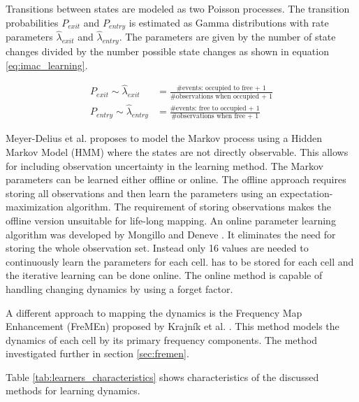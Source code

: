 
Transitions between states are modeled as two Poisson processes. The transition probabilities $P_{exit}$ and $P_{entry}$ is estimated as Gamma distributions with rate parameters $\hat{\lambda}_{exit}$ and $\hat{\lambda}_{entry}$.
The parameters are given by the number of state changes divided by the number possible state changes as shown in equation \ref{eq:imac_learning}.

\begin{align}
	P_{exit} \sim \hat{\lambda}_{exit} &= \frac{\text{\#events: occupied to free + 1}}{\text{\#observations when occupied + 1}} \label{eq:imac_learning}\\
	P_{entry} \sim\hat{\lambda}_{entry} &= \frac{\text{\#events: free to occupied + 1}}{\text{\#observations when free + 1}}
	\nonumber
\end{align}


Meyer-Delius et al. \cite{Meyer-Delius2012} proposes to model the Markov process using a Hidden Markov Model (HMM) where the states are not directly observable.
This allows for  including observation uncertainty in the learning method.
The Markov parameters can be learned either offline or online.
The offline approach requires storing all observations and then learn the parameters using an expectation-maximization algorithm. 
The requirement of storing observations makes the offline version unsuitable for life-long mapping. 
An online parameter learning algorithm was developed by Mongillo and Deneve \cite{Mongillo2008}. 
It eliminates the need for storing the whole observation set. 
Instead only 16 values are needed to continuously learn the parameters for each cell. 
has to be stored for each cell and the iterative learning can be done online. 
The online method is capable of handling changing dynamics by using a forget factor. 

A different approach to mapping the dynamics is the Frequency Map Enhancement (FreMEn) proposed by Krajník et al. \cite{Krajnik2014}. This method models the dynamics of each cell by its primary frequency components.
The method investigated further in section \ref{sec:fremen}.

Table \ref{tab:learners_characteristics} shows characteristics of the discussed methods for learning dynamics. 

